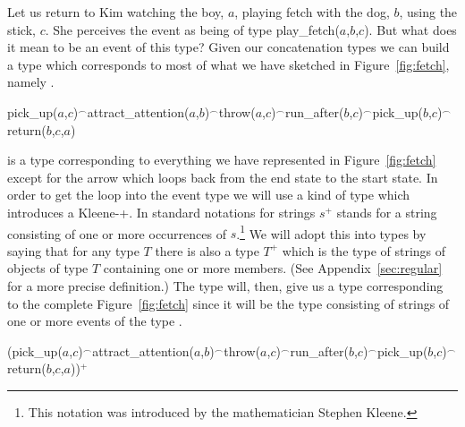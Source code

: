 Let us return to Kim watching the boy, $a$, playing fetch with the
dog, $b$, using the stick, $c$. %
She
perceives the event as being of type play\_fetch($a$,$b$,$c$).
But what does it mean to be an event of this type?  Given our
concatenation types we can build a type which corresponds to most of
what we have sketched in Figure~\ref{fig:fetch}, namely \nexteg{}.
\begin{ex} 
pick\_up($a$,$c$)$^{\frown}$attract\_attention($a$,$b$)$^{\frown}$throw($a$,$c$)$^{\frown}$run\_after($b$,$c$)$^{\frown}$pick\_up($b$,$c$)$^{\frown}$return($b$,$c$,$a$) 
\end{ex} 
\preveg{} is a type corresponding to everything we have represented in
Figure~\ref{fig:fetch} except for the arrow which loops back from the
end state to the start state.    In order to get the loop into the event
type we will use a kind of type which introduces a Kleene-+.  In
standard notations for strings $s^+$ stands for a string consisting of
one or more occurrences of $s$.\footnote{This notation was introduced
  by the mathematician Stephen Kleene.}  We will adopt this into types
by saying that for any type $T$ there is also a type $T^+$ which is
the type of strings of objects of type $T$ containing one or more
members.  (See Appendix~\ref{sec:regular} for a more precise
definition.)  The type \nexteg{} will, then,
give us a type corresponding to the complete Figure~\ref{fig:fetch}
since it will be the type consisting of strings of one or more events
of the type \preveg{}.
\begin{ex} 
(pick\_up($a$,$c$)$^{\frown}$attract\_attention($a$,$b$)$^{\frown}$throw($a$,$c$)$^{\frown}$run\_after($b$,$c$)$^{\frown}$pick\_up($b$,$c$)$^{\frown}$
\\ return($b$,$c$,$a$))$^+$ 
\end{ex}



